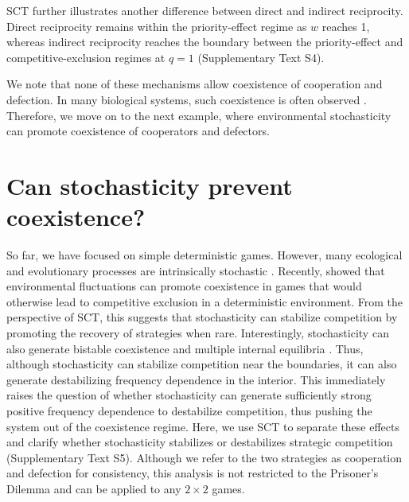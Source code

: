 \documentclass[12pt]{article}
\begin{document}
SCT further illustrates another difference between direct and indirect reciprocity.
Direct reciprocity remains within the priority-effect regime as $w$ reaches 1, whereas indirect reciprocity reaches the boundary between the priority-effect and competitive-exclusion regimes at $q=1$ (Supplementary Text S4).

We note that none of these mechanisms allow coexistence of cooperation and defection.
In many biological systems, such coexistence is often observed \citep{gore2009snowdrift,cordero2012public,kocher2018genetic,pollak2021public,lin2024interspecific}.
Therefore, we move on to the next example, where environmental stochasticity can promote coexistence of cooperators and defectors.

\section*{Can stochasticity prevent coexistence?}

So far, we have focused on simple deterministic games. 
However, many ecological and evolutionary processes are intrinsically stochastic \citep{traulsen2004stochastic,huang2015stochastic,hilbe2018evolution,zheng2018environmental,su2019evolutionary}.
Recently, \cite{wang2025evolution} showed that environmental fluctuations can promote coexistence in games that would otherwise lead to competitive exclusion in a deterministic environment. 
From the perspective of SCT, this suggests that stochasticity can stabilize competition by promoting the recovery of strategies when rare.
Interestingly, stochasticity can also generate bistable coexistence and multiple internal equilibria \citep{wang2025evolution}.
Thus, although stochasticity can stabilize competition near the boundaries, it can also generate destabilizing frequency dependence in the interior. 
This immediately raises the question of whether stochasticity can generate sufficiently strong positive frequency dependence to destabilize competition, thus pushing the system out of the coexistence regime.
Here, we use SCT to separate these effects and clarify whether stochasticity stabilizes or destabilizes strategic competition (Supplementary Text S5).
Although we refer to the two strategies as cooperation and defection for consistency, this analysis is not restricted to the Prisoner’s Dilemma and can be applied to any $2\times 2$ games.
\end{document}
